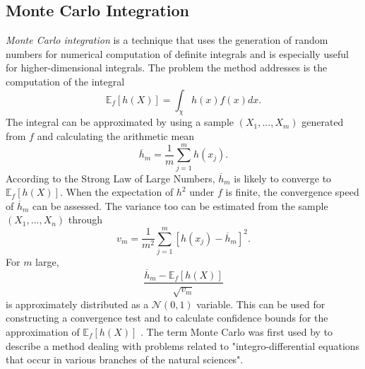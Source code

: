 \subsection{Monte Carlo Integration}
\textit{Monte Carlo integration} is a technique that uses the generation of random numbers for numerical computation of definite integrals and is especially useful for higher-dimensional integrals. The problem the method addresses is the computation of the integral
\begin{equation}
    \mathbb{E}_f\left[h\left(X\right)\right]=\int_\chi h(x)f(x)dx.
\end{equation}
The integral can be approximated by using a sample $\left(X_1,...,X_m\right)$ generated from $f$ and calculating the arithmetic mean
\begin{equation}
    \overline{h}_m=\frac{1}{m}\sum_{j=1}^mh\left(x_j\right).
\end{equation}
According to the Strong Law of Large Numbers, $\overline{h}_m$ is likely to converge to $\mathbb{E}_f\left[h\left(X\right)\right]$. When the expectation of $h^2$ under $f$ is finite, the convergence speed of $\overline{h}_m$ can be assessed. The variance too can be estimated from the sample $\left(X_1,...,X_n\right)$ through
\begin{equation}
    v_m=\frac{1}{m^2}\sum_{j=1}^m\left[h\left(x_j\right)-\overline{h}_m\right]^2.
\end{equation}
For $m$ large,
\begin{equation}
    \frac{\overline{h}_m-\mathbb{E}_f\left[h\left(X\right)\right]}{\sqrt{v_m}}
\end{equation}
is approximately distributed as a $\mathcal{N}(0,1)$ variable. This can be used for constructing a convergence test and to calculate confidence bounds for the approximation of $\mathbb{E}_f\left[h\left(X\right)\right]$ \autocite[][83--84]{robert2013monte}. The term Monte Carlo was first used by \cite{metropolis1949monte} to describe a method dealing with problems related to "integro-differential equations that occur in various branches of the natural sciences".

